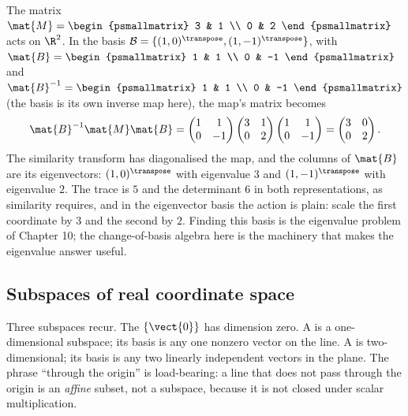 \begin{example}
The matrix $\mat{M} = \begin{psmallmatrix} 3 & 1 \\ 0 & 2
\end{psmallmatrix}$ acts on $\R^{2}$. In the basis $\mathcal{B} =
\{(1, 0)^{\transpose}, (1, -1)^{\transpose}\}$, with $\mat{B} =
\begin{psmallmatrix} 1 & 1 \\ 0 & -1 \end{psmallmatrix}$ and
$\mat{B}^{-1} = \begin{psmallmatrix} 1 & 1 \\ 0 & -1
\end{psmallmatrix}$ (the basis is its own inverse map here), the map's
matrix becomes
\[
\mat{B}^{-1}\mat{M}\mat{B} = \begin{pmatrix} 1 & 1 \\ 0 & -1
\end{pmatrix}\begin{pmatrix} 3 & 1 \\ 0 & 2 \end{pmatrix}
\begin{pmatrix} 1 & 1 \\ 0 & -1 \end{pmatrix} = \begin{pmatrix} 3 & 0
\\ 0 & 2 \end{pmatrix}.
\]
The similarity transform has diagonalised the map, and the columns of
$\mat{B}$ are its eigenvectors: $(1, 0)^{\transpose}$ with eigenvalue
$3$ and $(1, -1)^{\transpose}$ with eigenvalue $2$. The trace is $5$
and the determinant $6$ in both representations, as similarity
requires, and in the eigenvector basis the action is plain: scale the
first coordinate by $3$ and the second by $2$. Finding this basis is
the eigenvalue problem of Chapter 10; the change-of-basis algebra here
is the machinery that makes the eigenvalue answer useful.
\end{example}

\subsection{Subspaces of real coordinate space}

Three subspaces recur. The  $\{\vect{0}\}$ has
dimension zero. A  is a one-dimensional
subspace; its basis is any one nonzero vector on the line. A
 is two-dimensional; its basis is
any two linearly independent vectors in the plane. The phrase
``through the origin'' is load-bearing: a line that does not pass
through the origin is an \emph{affine} subset, not a subspace, because
it is not closed under scalar multiplication.

